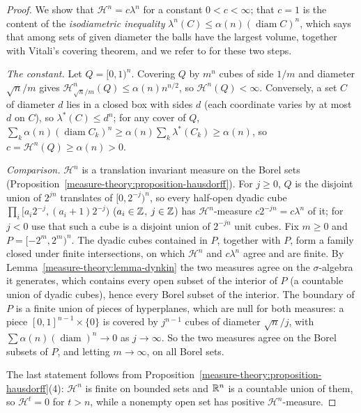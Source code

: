 \begin{proof}
We show that $\mathcal{H}^n = c\lambda^n$ for a constant $0 < c < \infty$; that $c = 1$ is the content of the \emph{isodiametric inequality} $\lambda^n(C) \leq \alpha(n)(\operatorname{diam}C)^n$,
which says that among sets of given diameter the balls have the largest volume, together with Vitali's covering theorem, and we refer to \cite[Section 2.2]{evans-gariepy} for these two steps.

\emph{The constant.} Let $Q = [0, 1)^n$. Covering $Q$ by $m^n$ cubes of side $1/m$ and diameter $\sqrt n/m$ gives $\mathcal{H}^n_{\sqrt n/m}(Q) \leq \alpha(n)n^{n/2}$, so
$\mathcal{H}^n(Q) < \infty$. Conversely, a set $C$ of diameter $d$ lies in a closed box with sides $d$ (each coordinate varies by at most $d$ on $C$), so $\lambda^*(C) \leq d^n$; for any cover
of $Q$, $\sum_k\alpha(n)(\operatorname{diam}C_k)^n \geq \alpha(n)\sum_k\lambda^*(C_k) \geq \alpha(n)$, so $c = \mathcal{H}^n(Q) \geq \alpha(n) > 0$.

\emph{Comparison.} $\mathcal{H}^n$ is a translation invariant measure on the Borel sets (Proposition~\ref{measure-theory:proposition-hausdorff}). For $j \geq 0$, $Q$ is the disjoint union of $2^{jn}$
translates of $[0, 2^{-j})^n$, so every half-open dyadic cube $\prod_i[a_i2^{-j}, (a_i + 1)2^{-j})$ ($a_i \in \mathbb{Z}$, $j \in \mathbb{Z}$) has $\mathcal{H}^n$-measure $c2^{-jn} = c\lambda^n$ of it; for
$j < 0$ use that such a cube is a disjoint union of $2^{-jn}$ unit cubes. Fix $m \geq 0$ and $P = [-2^m, 2^m)^n$. The dyadic cubes contained in $P$, together with $P$, form a family closed under
finite intersections, on which $\mathcal{H}^n$ and $c\lambda^n$ agree and are finite. By Lemma~\ref{measure-theory:lemma-dynkin} the two measures agree on the $\sigma$-algebra it generates, which
contains every open subset of the interior of $P$ (a countable union of dyadic cubes), hence every Borel subset of the interior. The boundary of $P$ is a finite union of pieces of hyperplanes,
which are null for both measures: a piece $[0, 1]^{n-1} \times \{0\}$ is covered by $j^{n-1}$ cubes of diameter $\sqrt n/j$, with $\sum\alpha(n)(\operatorname{diam})^n \to 0$ as $j \to \infty$. So
the two measures agree on the Borel subsets of $P$, and letting $m \to \infty$, on all Borel sets.

The last statement follows from Proposition~\ref{measure-theory:proposition-hausdorff}(4): $\mathcal{H}^n$ is finite on bounded sets and $\mathbb{R}^n$ is a countable union of them, so
$\mathcal{H}^t = 0$ for $t > n$, while a nonempty open set has positive $\mathcal{H}^n$-measure.
\end{proof}

